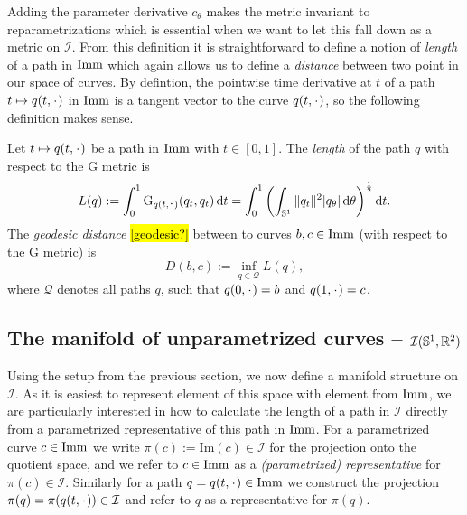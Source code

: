 Adding the parameter derivative $c_{\theta}$ makes the metric invariant to reparametrizations which is essential when we want to let this fall down as a metric on $\mathcal{I}$. From this definition it is straightforward to define a notion of \textit{length} of a path in $\mathop{}\!\mathrm{Imm}$ which again allows us to define a \textit{distance} between two point in our space of curves. By defintion, the pointwise time derivative at $t$ of a path $t \mapsto q(t, \blank)$ in $\mathop{}\!\mathrm{Imm}$ is a tangent vector to the curve $q(t,\blank)$, so the following definition makes sense.

\begin{definition}
  \label{def:length-in-imm}
  Let $t \mapsto q(t,\blank)$ be a path in $\mathop{}\!\mathrm{Imm}$ with $t \in [0,1]$. The \textit{length} of the path $q$ with respect to the $\mathrm{G}$ metric  is
  \begin{equation*}
    L(q) := \int_{0}^{1} \mathrm{G}_{q(t,\blank)}(q_t,q_t) \diff t =
    \int_{0}^{1}
    \left(
      \int_{\S^{1}} \|q_t\|^2 |q_{\theta}| \diff \theta
    \right)^{\frac{1}{2}}
    \diff t.
  \end{equation*}
  The \textit{geodesic distance} \hl{[geodesic?]} between to curves $b,c \in \mathop{}\!\mathrm{Imm}$ (with respect to the $\mathrm{G}$ metric) is
  \begin{equation*}
    D(b,c) := \inf_{q \in \mathcal{Q}} L(q),
  \end{equation*}
  where $\mathcal{Q}$ denotes all paths $q$, such that $q(0,\blank)=b$ and $q(1,\blank)=c$.
\end{definition}


\subsection{The manifold of unparametrized curves -- $\mathcal{I}(\mathbb{S}^1, \mathbb{R}^2)$}
\label{sec:manif-unpar-curv}

Using the setup from the previous section, we now define a manifold structure on $\mathcal{I}$. As it is easiest to represent element of this space with element from $\mathop{}\!\mathrm{Imm}$, we are particularly interested in how to calculate the length of a path in $\mathcal{I}$ directly from a parametrized representative of this path in $\mathop{}\!\mathrm{Imm}$. For a parametrized curve $c \in \mathop{}\!\mathrm{Imm}$ we write $\pi(c) := \mathrm{Im}(c)\in \mathcal{I}$ for the projection onto the quotient space, and we refer to $c\in\mathop{}\!\mathrm{Imm}$ as a \textit{(parametrized) representative} for $\pi(c) \in \mathcal{I}$. Similarly for a path $q = q(t, \blank) \in \I$ we construct the projection $\pi(q) = \pi(q(t,\blank)) \in \mathcal{I}$ and refer to $q$ as a representative for $\pi(q)$.

